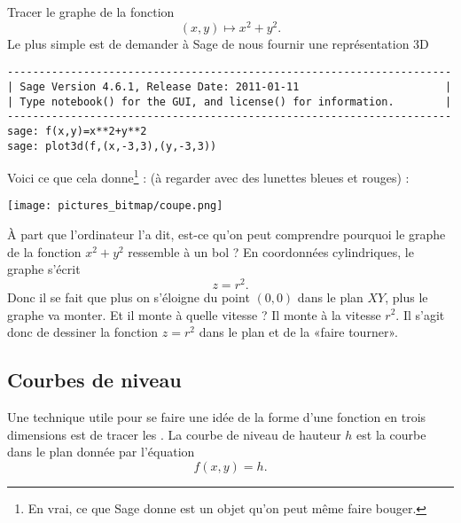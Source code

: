 \begin{example}     \label{ExempleTroisDxxyy}

    Tracer le graphe de la fonction
    \begin{equation}
        (x,y)\mapsto x^2+y^2.
    \end{equation}
    Le plus simple est de demander à Sage de nous fournir une représentation 3D
    \begin{verbatim}
----------------------------------------------------------------------
| Sage Version 4.6.1, Release Date: 2011-01-11                       |
| Type notebook() for the GUI, and license() for information.        |
----------------------------------------------------------------------
sage: f(x,y)=x**2+y**2
sage: plot3d(f,(x,-3,3),(y,-3,3))
    \end{verbatim}

    Voici ce que cela donne\footnote{En vrai, ce que Sage donne est un objet qu'on peut même faire bouger.} : (à regarder avec des lunettes bleues et rouges) :
    \begin{center}
            \texttt{[image: pictures\_bitmap/coupe.png]}
    \end{center}
    À part que l'ordinateur l'a dit, est-ce qu'on peut comprendre pourquoi le graphe de la fonction $x^2+y^2$ ressemble à un bol ? En coordonnées cylindriques, le graphe s'écrit
    \begin{equation}
        z=r^2.
    \end{equation}
    Donc il se fait que plus on s'éloigne du point $(0,0)$ dans le plan $XY$, plus le graphe va monter. Et il monte à quelle vitesse ? Il monte à la vitesse $r^2$. Il s'agit donc de dessiner la fonction $z=r^2$ dans le plan et de la «faire tourner».

\end{example}

\subsection{Courbes de niveau}

Une technique utile pour se faire une idée de la forme d'une fonction en trois dimensions est de tracer les . La courbe de niveau de hauteur $h$ est la courbe dans le plan donnée par l'équation
\begin{equation}
    f(x,y)=h.
\end{equation}

